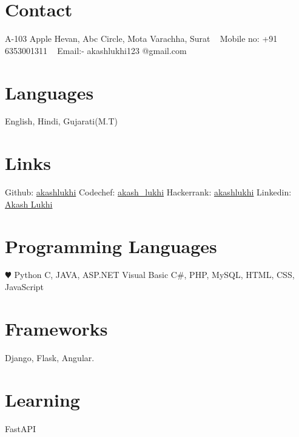 \documentclass[]{cv-style}
\begin{document}


\begin{aside}
%
\section{Contact}
A-103 Apple Hevan,
Abc Circle, Mota 
Varachha, Surat
~
Mobile no:
+91 6353001311
~
Email:-
akashlukhi123
@gmail.com
%

\section{Languages}
English, Hindi,
Gujarati(M.T)
%


\section{Links}
Github: \href{https://github.com/akashlukhi}{akashlukhi}
Codechef: \href{https://www.codechef.com/users/akash_lukhi}{akash\_lukhi}
Hackerrank: \href{https://www.hackerrank.com/akashlukhi}{akashlukhi}
Linkedin: \href{https://www.linkedin.com/in/akash-lukhi-b0540a213/}{Akash Lukhi}
%

\section{Programming
   Languages}
{\color{red} $\varheartsuit$} Python
C, JAVA, ASP.NET
Visual Basic C\#,
PHP, MySQL, HTML,
CSS, JavaScript
%

\section{Frameworks}
Django, Flask,
Angular.
%
\section{Learning}
FastAPI

\end{aside}



\end{document}

